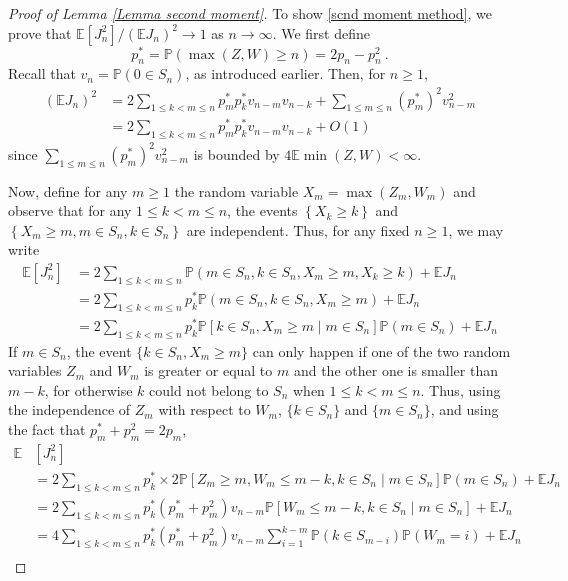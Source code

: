 \documentclass[12pt]{article}
\newcommand{\E}{\mathbb{E}}
\newcommand{\procond}[2]{\mathbb{P}\mathopen{}\left[#1\middle|#2\right]}
\numberwithin{equation}{section} \font\titre=cmbx12
\newcommand{\PP}{\mathbb{P}}
\newcommand{\prob}[1]{\mathbb{P}\left( #1 \right)}
\begin{document}
\begin{proof}[Proof of Lemma \ref{Lemma second moment}]
To show \eqref{scnd moment method}, we prove that $\E[J_n^2]/(\E J_n)^2\to 1$ as $n \to \infty$. We first define
$$
p_n^*=\PP(\max(Z,W)\ge n) = 2p_n - p_n^2~.
$$
Recall that $v_n = \PP(0 \in S_n)$, as introduced earlier. Then, for $n\ge 1$,
\begin{align}
    (\E J_n)^2 &= 2\sum_{1\le k<m\le n} p_m^* p_k^* v_{n-m}v_{n-k} + \sum_{1\le m \le n} (p_m^*)^2 v_{n-m}^2 \nonumber \\
    &= 2\sum_{1\le k<m\le n} p_m^* p_k^* v_{n-m}v_{n-k} + O(1)
\end{align}
since $\sum_{1\le m \le n} (p_m^*)^2 v_{n-m}^2$ is bounded by $4\E
\min (Z,W) <\infty$.

Now, define for any $m\ge 1$ the random variable $X_m=\max(Z_m, W_m)$ and observe that for any $1\le k < m \le n$, the events $\left\{ X_k\ge k\right\}$ and $\left\{ X_m\ge m, m\in S_n, k \in S_n\right\}$ are independent.
Thus, for any fixed $n\ge 1$, we may write
\begin{align}
    \E\left[ J_n^2\right] &= 2\sum_{1\le k < m \le n} \prob{m\in S_n, k\in S_n, X_m\ge m, X_k\ge k} + \E J_n \nonumber \\
    &= 2\sum_{1\le k < m \le n} p_k^*\prob{m\in S_n, k\in S_n, X_m\ge m} + \E J_n \nonumber \\
    &= 2\sum_{1\le k < m \le n} p_k^* \procond{k\in S_n, X_m \ge m}{m\in S_n}\prob{m\in S_n}+ \E J_n \nonumber 
\end{align}
If $m\in S_n$, the event $\{k\in S_n, X_m\ge m\}$ can only happen if one of the two random variables $Z_m$ and $W_m$ is greater or equal to $m$ and the other one is smaller than $m-k$, for otherwise $k$ could not belong to $S_n$ when $1\le k<m \le n$. Thus,
using the independence of $Z_m$ with respect to $W_m$, $\{k\in S_n\}$ and $\{m\in S_n\}$, and using the fact that 
$p_m^* + p_m^2 = 2p_m$,
\begin{align}
     \E&\left[ J_n^2\right] \\
     &= 2\sum_{1\le k < m \le n} p_k^* \times 2 \procond{Z_m\ge m, W_m\le m-k , k\in S_n}{m\in S_n}\prob{m\in S_n}+ \E J_n \nonumber \\
     &= 2\sum_{1\le k < m \le n} p_k^* (p_m^*+p_m^2)v_{n-m}\procond{W_m\le m-k , k\in S_n}{m\in S_n}+ \E J_n \nonumber \\
    &= 4\sum_{1\le k < m \le n} p_k^* (p_m^*+p_m^2)v_{n-m}\sum_{i=1}^{k-m}\prob{k\in S_{m-i}}\prob{W_m=i}+ \E J_n \nonumber \\

\end{align}
\end{proof}
\end{document}
